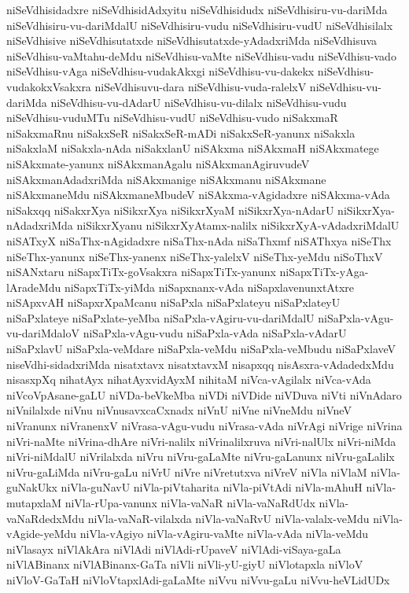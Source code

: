 {niSeVdhisidadxre
niSeVdhisidAdxyitu
niSeVdhisidudx
niSeVdhisiru-vu-dariMda
niSeVdhisiru-vu-dariMdalU
niSeVdhisiru-vudu
niSeVdhisiru-vudU
niSeVdhisilalx
niSeVdhisive
niSeVdhisutatxde
niSeVdhisutatxde-yAdadxriMda
niSeVdhisuva
niSeVdhisu-vaMtahu-deMdu
niSeVdhisu-vaMte
niSeVdhisu-vadu
niSeVdhisu-vado
niSeVdhisu-vAga
niSeVdhisu-vudakAkxgi
niSeVdhisu-vu-dakekx
niSeVdhisu-vudakokxVsakxra
niSeVdhisuvu-dara
niSeVdhisu-vuda-ralelxV
niSeVdhisu-vu-dariMda
niSeVdhisu-vu-dAdarU
niSeVdhisu-vu-dilalx
niSeVdhisu-vudu
niSeVdhisu-vuduMTu
niSeVdhisu-vudU
niSeVdhisu-vudo
niSakxmaR
niSakxmaRnu
niSakxSeR
niSakxSeR-mADi
niSakxSeR-yanunx
niSakxla
niSakxlaM
niSakxla-nAda
niSakxlanU
niSAkxma
niSAkxmaH
niSAkxmatege
niSAkxmate-yanunx
niSAkxmanAgalu
niSAkxmanAgiruvudeV
niSAkxmanAdadxriMda
niSAkxmanige
niSAkxmanu
niSAkxmane
niSAkxmaneMdu
niSAkxmaneMbudeV
niSAkxma-vAgidadxre
niSAkxma-vAda
niSakxqq
niSakxrXya
niSikxrXya
niSikxrXyaM
niSikxrXya-nAdarU
niSikxrXya-nAdadxriMda
niSikxrXyanu
niSikxrXyAtamx-nalilx
niSikxrXyA-vAdadxriMdalU
niSATxyX
niSaThx-nAgidadxre
niSaThx-nAda
niSaThxmf
niSAThxya
niSeThx
niSeThx-yanunx
niSeThx-yanenx
niSeThx-yalelxV
niSeThx-yeMdu
niSoThxV
niSANxtaru
niSapxTiTx-goVsakxra
niSapxTiTx-yanunx
niSapxTiTx-yAga-lAradeMdu
niSapxTiTx-yiMda
niSapxnanx-vAda
niSapxlavenunxtAtxre
niSApxvAH
niSapxrXpaMcanu
niSaPxla
niSaPxlateyu
niSaPxlateyU
niSaPxlateye
niSaPxlate-yeMba
niSaPxla-vAgiru-vu-dariMdalU
niSaPxla-vAgu-vu-dariMdaloV
niSaPxla-vAgu-vudu
niSaPxla-vAda
niSaPxla-vAdarU
niSaPxlavU
niSaPxla-veMdare
niSaPxla-veMdu
niSaPxla-veMbudu
niSaPxlaveV
niseVdhi-sidadxriMda
nisatxtavx
nisatxtavxM
nisapxqq
nisAsxra-vAdadedxMdu
nisasxpXq
nihatAyx
nihatAyxvidAyxM
nihitaM
niVca-vAgilalx
niVca-vAda
niVcoVpAsane-gaLU
niVDa-beVkeMba
niVDi
niVDide
niVDuva
niVti
niVnAdaro
niVnilalxde
niVnu
niVnusavxcaCxnadx
niVnU
niVne
niVneMdu
niVneV
niVranunx
niVranenxV
niVrasa-vAgu-vudu
niVrasa-vAda
niVrAgi
niVrige
niVrina
niVri-naMte
niVrina-dhAre
niVri-nalilx
niVrinalilxruva
niVri-nalUlx
niVri-niMda
niVri-niMdalU
niVrilalxda
niVru
niVru-gaLaMte
niVru-gaLanunx
niVru-gaLalilx
niVru-gaLiMda
niVru-gaLu
niVrU
niVre
niVretutxva
niVreV
niVla
niVlaM
niVla-guNakUkx
niVla-guNavU
niVla-piVtaharita
niVla-piVtAdi
niVla-mAhuH
niVla-mutapxlaM
niVla-rUpa-vanunx
niVla-vaNaR
niVla-vaNaRdUdx
niVla-vaNaRdedxMdu
niVla-vaNaR-vilalxda
niVla-vaNaRvU
niVla-valalx-veMdu
niVla-vAgide-yeMdu
niVla-vAgiyo
niVla-vAgiru-vaMte
niVla-vAda
niVla-veMdu
niVlasayx
niVlAkAra
niVlAdi
niVlAdi-rUpaveV
niVlAdi-viSaya-gaLa
niVlABinanx
niVlABinanx-GaTa
niVli
niVli-yU-giyU
niVlotapxla
niVloV
niVloV-GaTaH
niVloVtapxlAdi-gaLaMte
niVvu
niVvu-gaLu
niVvu-heVLidUDx
}
